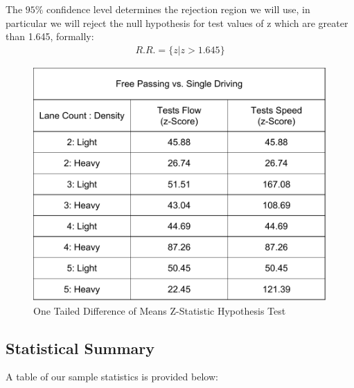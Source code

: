 \documentclass{amsart}
\begin{document}
	The $95\%$ confidence level determines the rejection region we will use, in particular we will reject the null hypothesis for test values of z which are greater than 1.645, formally:
	\begin{align*}
		R.R. = \{ z | z>1.645\}
	\end{align*}
\begin{figure}[H]
	\begin{center}
	\includegraphics[scale=0.4]{MCMProbablityZ}
	\caption{One Tailed Difference of Means Z-Statistic Hypothesis Test}
	\renewcommand{\figurename}{}
	\end{center}
	\end{figure}
	
\newpage

	\subsection{Statistical Summary}A table of our sample statistics is provided below:
	
\end{document}

